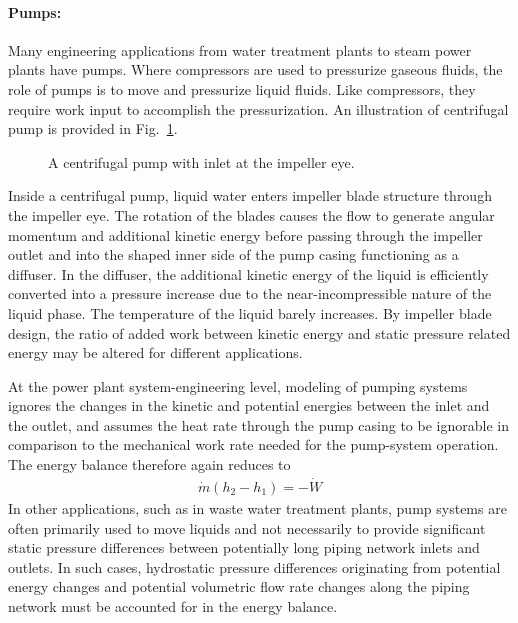 \paragraph{Pumps:} Many engineering applications from water treatment plants to steam power plants have pumps. Where compressors are used to pressurize gaseous fluids, the role of pumps is to move and pressurize liquid fluids. Like compressors, they require work input to accomplish the pressurization. An illustration of centrifugal pump is provided in Fig.~\ref{fig:pump}.
\begin{figure}[!htb]
    \centering
    
    \caption{A centrifugal pump with inlet at the impeller eye.}
    \label{fig:pump}
\end{figure}

Inside a centrifugal pump, liquid water enters impeller blade structure through the impeller eye. The rotation of the blades causes the flow to generate angular momentum and additional kinetic energy before passing through the impeller outlet and into the shaped inner side of the pump casing functioning as a diffuser. In the diffuser, the additional kinetic energy of the liquid is efficiently converted into a pressure increase due to the near-incompressible nature of the liquid phase. The temperature of the liquid barely increases. By impeller blade design, the ratio of added work between kinetic energy and static pressure related energy may be altered for different applications.

At the power plant system-engineering level, modeling of pumping systems ignores the changes in the kinetic and potential energies between the inlet and the outlet, and assumes the heat rate through the pump casing to be ignorable in comparison to the mechanical work rate needed for the pump-system operation. The energy balance therefore again reduces to 
\begin{align}
    \dot{m}(h_2-h_1)=-\dot{W}
\end{align}
In other applications, such as in waste water treatment plants, pump systems are often primarily used to move liquids and not necessarily to provide significant static pressure differences between potentially long piping network inlets and outlets. In such cases, hydrostatic pressure differences originating from potential energy changes and potential volumetric flow rate changes along the piping network must be accounted for in the energy balance. 

